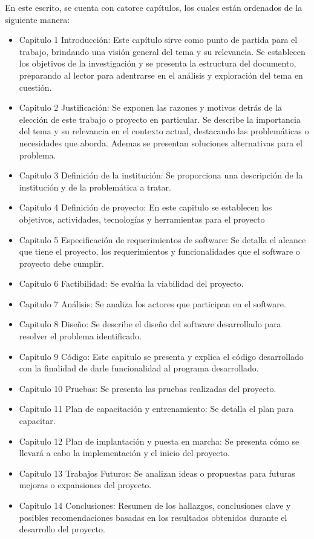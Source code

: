 \clearpage
En este escrito, se cuenta con catorce capítulos, los cuales están ordenados de la siguiente manera:
\begin{itemize}
    \item Capitulo 1 Introducción: Este capítulo sirve como punto de partida para el trabajo, brindando una visión general del tema y su relevancia. Se establecen los objetivos de la investigación y se presenta la estructura del documento, preparando al lector para adentrarse en el análisis y exploración del tema en cuestión.
    \item Capitulo 2 Justificación: Se exponen las razones y motivos detrás de la elección de este trabajo o proyecto en particular. Se describe la importancia del tema y su relevancia en el contexto actual, destacando las problemáticas o necesidades que aborda. Ademas se presentan soluciones alternativas para el problema.
    \item Capitulo 3 Definición de la institución: Se proporciona una descripción de la institución y de la problemática a tratar.
    \item Capitulo 4 Definición de proyecto: En este capitulo se establecen los objetivos, actividades, tecnologías y herramientas para el proyecto
    \item Capitulo 5 Especificación de requerimientos de software: Se detalla el alcance que tiene el proyecto, los requerimientos y funcionalidades que el software o proyecto debe cumplir.
    \item Capitulo 6 Factibilidad: Se evalúa la viabilidad del proyecto.
    \item Capitulo 7 Análisis: Se analiza los actores que participan en el software.
    \item Capitulo 8 Diseño: Se describe el diseño del software desarrollado para resolver el problema identificado.
    \item Capitulo 9 Código: Este capitulo se presenta y explica el código desarrollado con la finalidad de darle funcionalidad al programa desarrollado.
    \item Capitulo 10 Pruebas: Se presenta las pruebas realizadas del proyecto.
    \item Capitulo 11 Plan de capacitación y entrenamiento: Se detalla el plan para capacitar.
    \item Capitulo 12 Plan de implantación y puesta en marcha: Se presenta cómo se llevará a cabo la implementación y el inicio del proyecto.
    \item Capitulo 13 Trabajos Futuros: Se analizan ideas o propuestas para futuras mejoras o expansiones del proyecto.
    \item Capitulo 14 Conclusiones: Resumen de los hallazgos, conclusiones clave y posibles recomendaciones basadas en los resultados obtenidos durante el desarrollo del proyecto.
\end{itemize}